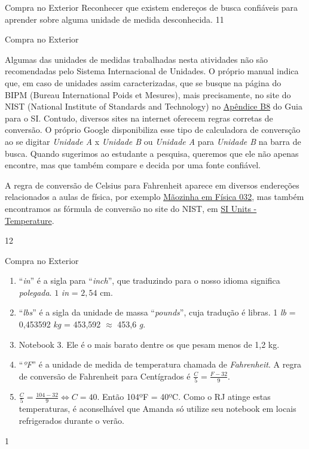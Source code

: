 \begin{objectives}{Compra no Exterior}
{
Reconhecer que existem endereços de busca confiáveis para aprender sobre alguma unidade de medida desconhecida.
}{1}{1}
\end{objectives}
\begin{sugestions}{Compra no Exterior}
{
Algumas das unidades de medidas trabalhadas nesta atividades não são recomendadas pelo Sistema Internacional de Unidades. O próprio manual indica que, em caso de unidades assim caracterizadas, que se busque na página do BIPM (Bureau International Poids et Mesures), mais precisamente, no site do NIST (National Institute of Standards and Technology) no \href{https://www.nist.gov/physical-measurement-laboratory/nist-guide-si-appendix-b8}{Apêndice B8} do Guia para o SI. Contudo, diversos sites na internet oferecem regras corretas de conversão. O próprio Google disponibiliza esse tipo de calculadora de conversção ao se digitar \textit{Unidade A} x \textit{Unidade B} ou \textit{Unidade A} para \textit{Unidade B} na barra de busca. Quando sugerimos ao estudante a pesquisa, queremos que ele não apenas encontre, mas que também compare e decida por uma fonte confiável.

A regra de conversão de Celsius para Fahrenheit aparece em diversos endereções relacionados a aulas de física, por exemplo \href{https://youtu.be/REpQB5clONM}{Mãozinha em Física 032}, mas também encontramos as fórmula de conversão no site do NIST, em \href{https://www.nist.gov/pml/weights-and-measures/si-units-temperature}{SI Units - Temperature}.
}{1}{2}
\end{sugestions}
\begin{answer}{Compra no Exterior}
{
\begin{enumerate}
\item “\textit{in}” é a sigla para “\textit{inch}”, que traduzindo para o nosso idioma significa \textit{polegada}. $1$ \textit{in} = $2{,}54$ cm.

\setcounter{enumi}{2}
\item “\textit{lbs}” é a sigla da unidade de massa “\textit{pounds}”, cuja tradução é libras. 1 \textit{lb} = 0,453592 \textit{kg} = 453,592 \(\approx\) 453,6 \textit{g}.

\setcounter{enumi}{4}
\item Notebook 3. Ele é o mais barato dentre os que pesam menos de 1,2 kg.

\item {} 
“\textit{ºF}” é a unidade de medida de temperatura chamada de \textit{Fahrenheit}. A regra de conversão de Fahrenheit para Centígrados é \(\frac{C}{5} = \frac{F - 32}{9}\).

\item {} 
\(\frac{C}{5} = \frac{104-32}{9} \Leftrightarrow C = 40\). Então 104ºF = 40ºC. Como o RJ atinge estas temperaturas, é aconselhável que Amanda só utilize seu notebook em locais refrigerados durante o verão.

\end{enumerate}
}{1}
\end{answer}
